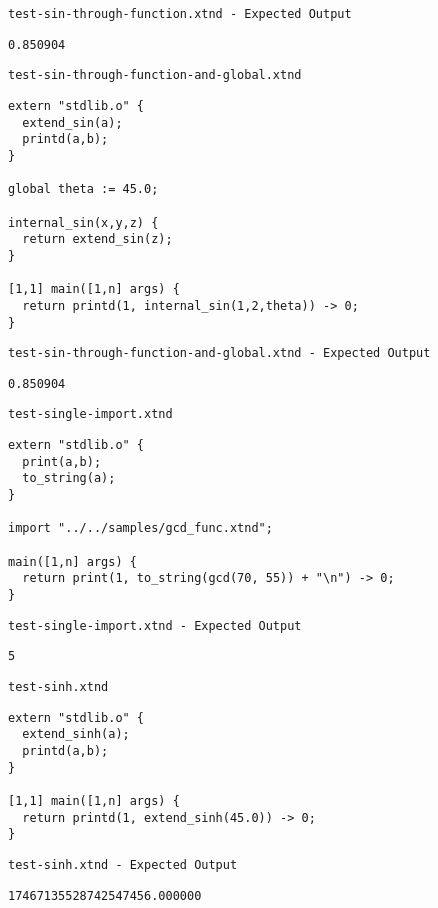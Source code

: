 \medskip \noindent \texttt{test-sin-through-function.xtnd - Expected Output}


\begin{lstlisting}
0.850904
\end{lstlisting}


\medskip \noindent \texttt{test-sin-through-function-and-global.xtnd}


\begin{lstlisting}
extern "stdlib.o" {
  extend_sin(a);
  printd(a,b);
}

global theta := 45.0;

internal_sin(x,y,z) {
  return extend_sin(z);
}

[1,1] main([1,n] args) {
  return printd(1, internal_sin(1,2,theta)) -> 0;
}
\end{lstlisting}


\medskip \noindent \texttt{test-sin-through-function-and-global.xtnd - Expected Output}


\begin{lstlisting}
0.850904
\end{lstlisting}


\medskip \noindent \texttt{test-single-import.xtnd}


\begin{lstlisting}
extern "stdlib.o" {
  print(a,b);
  to_string(a);
}

import "../../samples/gcd_func.xtnd";

main([1,n] args) {
  return print(1, to_string(gcd(70, 55)) + "\n") -> 0;
}
\end{lstlisting}


\medskip \noindent \texttt{test-single-import.xtnd - Expected Output}


\begin{lstlisting}
5
\end{lstlisting}


\medskip \noindent \texttt{test-sinh.xtnd}


\begin{lstlisting}
extern "stdlib.o" {
  extend_sinh(a);
  printd(a,b);
}

[1,1] main([1,n] args) {
  return printd(1, extend_sinh(45.0)) -> 0;
}
\end{lstlisting}


\medskip \noindent \texttt{test-sinh.xtnd - Expected Output}


\begin{lstlisting}
17467135528742547456.000000
\end{lstlisting}


